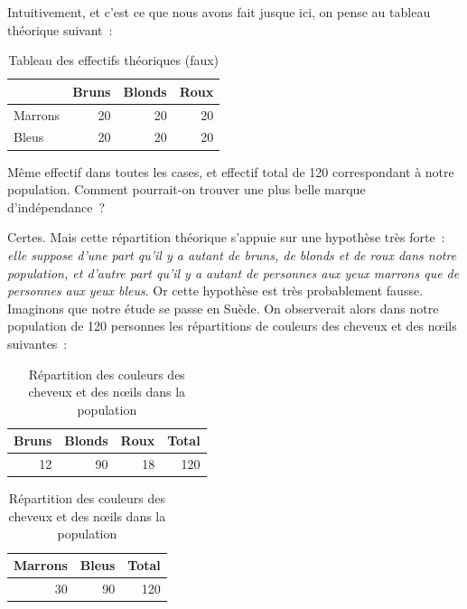 \documentclass[a4paper,10pt,twoside,francais]{report}
\begin{document}
Intuitivement, et c'est ce que nous avons fait jusque ici, on pense au
tableau théorique suivant~:

\begin{table}[H]
  \begin{center}
    \begin{tabular}[h!]{lrrr}
      \toprule
      & Bruns & Blonds & Roux \\
      \midrule
      Marrons & 20 & 20 & 20 \\
      Bleus & 20 & 20 & 20 \\
      \bottomrule
    \end{tabular}
    \caption{Tableau des effectifs théoriques (faux)}
    \label{tabindepfausse}
  \end{center}
\end{table}


Même effectif dans toutes les cases, et effectif total de 120
correspondant à notre population. Comment pourrait-on trouver une plus
belle marque d'indépendance~?

Certes. Mais cette répartition théorique s'appuie sur une hypothèse
très forte~: \textit{elle suppose d'une part qu'il y a autant de
  bruns, de blonds et de roux dans notre population, et d'autre part
  qu'il y a autant de personnes aux yeux marrons que de personnes aux
  yeux bleus}. Or cette hypothèse est très probablement
fausse. Imaginons que notre étude se passe en Suède. On observerait
alors dans notre population de 120 personnes les répartitions de
couleurs des cheveux et des n\oe{}ils suivantes~:

\begin{table}[H]
\begin{center}
  \hfill
  \begin{minipage}[c]{.40\linewidth}
    \begin{tabular}{rrrr}
      \toprule
      Bruns & Blonds & Roux & Total\\
      \midrule
      12 & 90 & 18 & 120\\
      \bottomrule
    \end{tabular}
  \end{minipage} 
  \hfill
  \begin{minipage}[c]{.30\linewidth}
    \begin{tabular}{rrr}
      \toprule
      Marrons & Bleus & Total \\
      \midrule
      30 & 90 & 120 \\
      \bottomrule
    \end{tabular}
  \end{minipage}
  \hfill
  \caption{Répartition des couleurs des cheveux et des n\oe{}ils dans la
    population}
  \label{repartcolpop}
\end{center}
\end{table}
\end{document}
